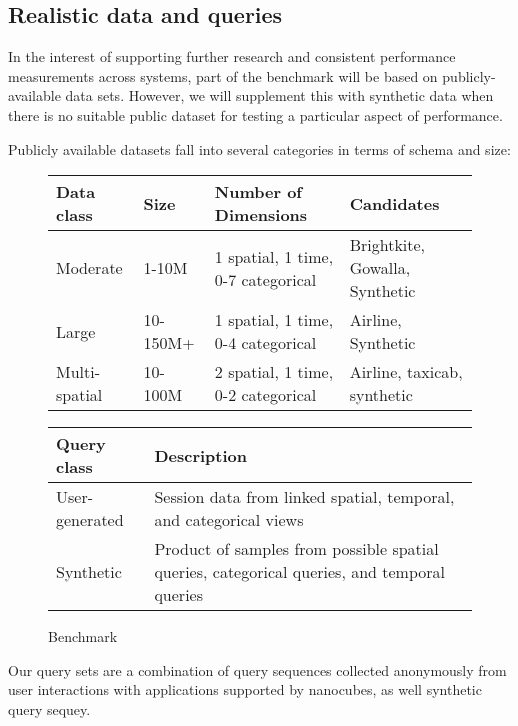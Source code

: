 \documentclass[journal]{vgtc}                %
\begin{document}
\subsection{Realistic data and queries}

In the interest of supporting further research and consistent performance measurements across systems, part of the benchmark will be based on publicly-available data sets. However, we will supplement this with synthetic data when there is no suitable public dataset for testing a particular aspect of performance.

Publicly available datasets fall into several categories in terms of schema and size:

\begin{figure*}
 \scriptsize
 \label{benchmark-figure}
 \caption{Benchmark}
 \begin{tabular}{ p{3cm}p{2cm}p{4cm}p{4cm} }
   Data class & Size & Number of Dimensions & Candidates \\
   \hline
   Moderate & 1-10M & 1 spatial, 1 time, 0-7 categorical & Brightkite, Gowalla, Synthetic \\
   Large & 10-150M+ & 1 spatial, 1 time, 0-4 categorical & Airline, Synthetic \\ 
   Multi-spatial & 10-100M & 2 spatial, 1 time, 0-2 categorical & Airline, taxicab, synthetic\\
 \end{tabular}
 \begin{tabular}{p{3cm}p{5cm}}
   Query class & Description \\
   \hline
   User-generated & Session data from linked spatial, temporal, and categorical views \\
   Synthetic & Product of samples from possible spatial queries, categorical queries, and temporal queries\\
 \end{tabular}
\end{figure*}


Our query sets are a combination of query sequences collected anonymously from user interactions with applications supported by nanocubes, as well synthetic query sequey.

\end{document}
